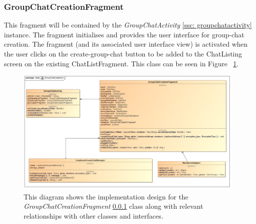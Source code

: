 \documentclass[11pt]{article}
\begin{document}
\subsubsection{GroupChatCreationFragment}\label{groupchatcreationfragment}
This fragment will be contained by the \textit{GroupChatActivity} \ref{ssc: groupchatactivity} instance. The fragment initialises and provides the user interface for group-chat creation. The fragment (and its associated user interface view) is activated when the user clicks on the create-group-chat button to be added to the ChatListing screen on the existing ChatListFragment. This class can be seen in Figure ~\ref{cd-group-chat-creation-ui}.
\begin{figure}[H]
\centering
\centerline{\includegraphics[width=7in]{./images/class_groupchat_creation_ui.png}}
\caption[Android Group Chat Creation UI Class Diagram]{This diagram shows the implementation design for the \textit{GroupChatCreationFragment} \ref{groupchatcreationfragment} class along with relevant relationships with other classes and interfaces.}
\label{cd-group-chat-creation-ui}
\end{figure}
\end{document}
